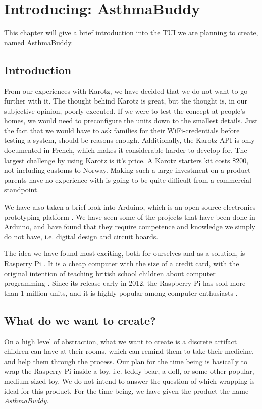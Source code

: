 
\chapter{Introducing: AsthmaBuddy}
\label{chp:our-solution}

This chapter will give a brief introduction into the TUI we are planning to create, named AsthmaBuddy. 

\section{Introduction}
\label{sec:our-solution-introduction}
From our experiences with Karotz, we have decided that we do not want to go further with it. The thought behind Karotz is great, but the thought is, in our subjective opinion, poorly executed. If we were to test the concept at people's homes, we would need to preconfigure the units down to the smallest details. Just the fact that we would have to ask families for their WiFi-credentials before testing a system, should be reasons enough.
Additionally, the Karotz API is only documented in French, which makes it considerable harder to develop for. The largest challenge by using Karotz is it's price. A Karotz starters kit costs \$200, not including customs to Norway. Making such a large investment on a product parents have no experience with is going to be quite difficult from a commercial standpoint.  



We have also taken a brief look into Arduino, which is an open source electronics prototyping platform \cite{arduino}. We have seen some of the projects that have been done in Arduino, and have found that they require competence and knowledge we simply do not have, i.e. digital design and circuit boards. 


The idea we have found most exciting, both for ourselves and as a solution, is Rasperry Pi \cite{rasperrypi}. It is a cheap computer with the size of a credit card, with the original intention of teaching british school children about computer programming \cite{rasperrypi-about}. Since its release early in 2012, the Raspberry Pi has sold more than 1 million units, and it is highly popular among computer enthusiasts \cite{pimillion}. 


\section{What do we want to create?}
On a high level of abstraction, what we want to create is a discrete artifact children can have at their rooms, which can remind them to take their medicine, and help them through the process. Our plan for the time being is basically to wrap the Rasperry Pi inside a toy, i.e. teddy bear, a doll, or some other popular, medium sized toy. We do not intend to answer the question of which wrapping is ideal for this product. For the time being, we have given the product the name \emph{AsthmaBuddy}. 

